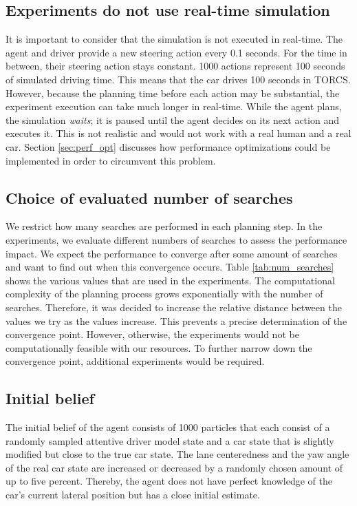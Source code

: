 \subsection{Experiments do not use real-time simulation}

It is important to consider that the simulation is not executed in real-time. The agent and driver provide a new steering action every 0.1 seconds. For the time in between, their steering action stays constant. 1000 actions represent 100 seconds of simulated driving time. This means that the car drives 100 seconds in TORCS. However, because the planning time before each action may be substantial, the experiment execution can take much longer in real-time. While the agent plans, the simulation \emph{waits}; it is paused until the agent decides on its next action and executes it. This is not realistic and would not work with a real human and a real car. Section \ref{sec:perf_opt} discusses how performance optimizations could be implemented in order to circumvent this problem. 

\subsection{Choice of evaluated number of searches}

 

We restrict how many searches are performed in each planning step. In the experiments, we evaluate different numbers of searches to assess the performance impact. We expect the performance to converge after some amount of searches and want to find out when this convergence occurs. Table \ref{tab:num_searches} shows the various values that are used in the experiments. The computational complexity of the planning process grows exponentially with the number of searches. Therefore, it was decided to increase the relative distance between the values we try as the values increase. This prevents a precise determination of the convergence point. However, otherwise, the experiments would not be computationally feasible with our resources. To further narrow down the convergence point, additional experiments would be required.

\subsection{Initial belief}

The initial belief of the agent consists of 1000 particles that each consist of a randomly sampled attentive driver model state and a car state that is slightly modified but close to the true car state. The lane centeredness and the yaw angle of the real car state are increased or decreased by a randomly chosen amount of up to five percent. Thereby, the agent does not have perfect knowledge of the car's current lateral position but has a close initial estimate.

